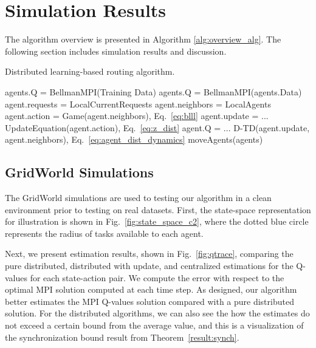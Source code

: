\documentclass[journal]{IEEEtran}
\begin{document}
\section{Simulation Results} \label{sec_sim_results}
The algorithm overview is presented in Algorithm \ref{alg:overview_alg}. The following section includes simulation results and discussion. 
\begin{algorithm} 
\caption{Distributed learning-based routing algorithm.}
\label{alg:overview_alg}
\begin{algorithmic}
\State agents.Q = BellmanMPI(Training Data) 
        \State agents.Q = BellmanMPI(agents.Data) 
        \EndIf
     
        \State agent.requests = LocalCurrentRequests 
        \State agent.neighbors = LocalAgents 
    	\EndFor
     
        \State agent.action = Game(agent.neighbors), Eq.~\eqref{eq:blll}
        \EndFor
     
        \State agent.update = ...
        \State    UpdateEquation(agent.action), Eq.~\eqref{eq:z_dist}
        \State agent.Q = ...
        \State D-TD(agent.update, agent.neighbors), Eq.~\eqref{eq:agent_dist_dynamics}
\EndFor	
    \State moveAgents(agents)
\EndWhile 
\end{algorithmic}
\end{algorithm}

\subsection{GridWorld Simulations}
The GridWorld simulations are used to testing our algorithm in a clean environment prior to testing on real datasets. 
First, the state-space representation for illustration is shown in Fig.~\ref{fig:state_space_c2}, where the dotted blue circle represents the radius of tasks available to each agent. 

Next, we present estimation results, shown in Fig.~\ref{fig:qtrace}, comparing the pure distributed, distributed with update, and centralized estimations for the Q-values for each state-action pair. We compute the error with respect to the optimal MPI solution computed at each time step. As designed, our algorithm better estimates the MPI Q-values solution compared with a pure distributed solution. For the distributed algorithms, we can also see the how the estimates do not exceed a certain bound from the average value, and this is a visualization of the synchronization bound result from Theorem~\ref{result:synch}. 
\end{document}
